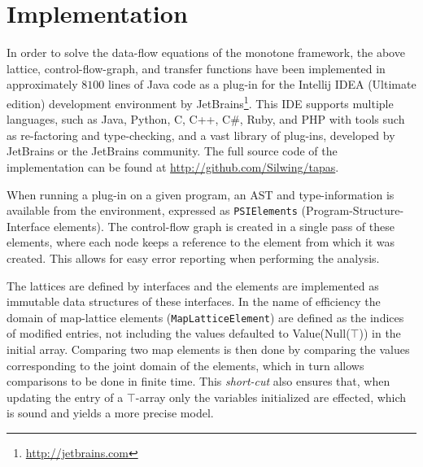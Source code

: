 \section{Implementation}
\label{sec:worklist}
In order to solve the data-flow equations of the monotone framework, the above lattice, control-flow-graph, and transfer functions have been implemented in approximately $8100$ lines of Java code as a plug-in for the Intellij IDEA (Ultimate edition) development environment by JetBrains\footnote{\url{http://jetbrains.com}}. This IDE supports multiple languages, such as Java, Python, C, C++, C\#, Ruby, and PHP with tools such as re-factoring and type-checking, and a vast library of plug-ins, developed by JetBrains or the JetBrains community. The full source code of the implementation can be found at \url{http://github.com/Silwing/tapas}.

When running a plug-in on a given program, an AST and type-information is available from the environment, expressed as \texttt{PSIElements} (Program-Structure-Interface elements).  The control-flow graph is created in a single pass of these elements, where each node keeps a reference to the element from which it was created. This allows for easy error reporting when performing the analysis. 

The lattices are defined by interfaces and the elements are implemented as immutable data structures of these interfaces. In the name of efficiency the domain of map-lattice elements (\texttt{MapLatticeElement}) are defined as the indices of modified entries, not including the values defaulted to Value(Null($\top$)) in the initial array. Comparing two map elements is then done by comparing the values corresponding to the joint domain of the elements, which in turn allows comparisons to be done in finite time. This \emph{short-cut} also ensures that, when updating the entry of a $\top$-array only the variables initialized are effected, which is sound and yields a more precise model.


